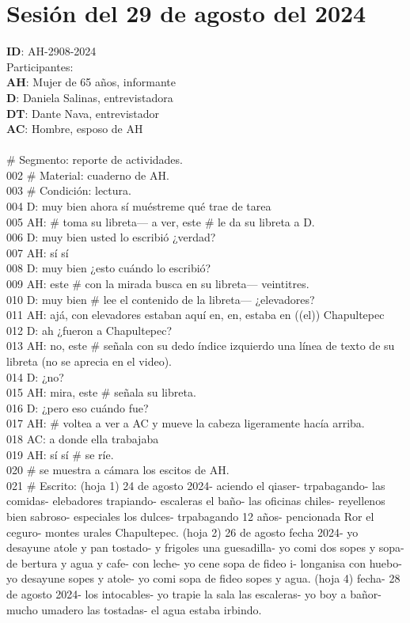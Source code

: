 \section{Sesión del 29 de agosto del 2024}
\noindent
\textbf{ID}: AH-2908-2024\\
Participantes:\\
\textbf{AH}: Mujer de 65 años, informante\\
\textbf{D}: Daniela Salinas, entrevistadora\\
\textbf{DT}: Dante Nava, entrevistador\\
\textbf{AC}: Hombre, esposo de AH\\
\\
 \# Segmento: reporte de actividades.\\
002 \# Material: cuaderno de AH.\\
003 \# Condición: lectura.\\
004 D: muy bien ahora sí muéstreme qué trae de tarea\\
005 AH: \# toma su libreta--- a ver, este \# le da su libreta a D.\\
006 D: muy bien usted lo escribió ¿verdad?\\
007 AH: sí sí\\
008 D: muy bien ¿esto cuándo lo escribió?\\
009 AH: este \# con la mirada busca en su libreta--- veintitres.\\
010 D: muy bien \# lee el contenido de la libreta--- ¿elevadores?\\
011 AH: ajá, con elevadores estaban aquí en, en, estaba en ((el)) Chapultepec\\
012 D: ah ¿fueron a Chapultepec?\\
013 AH: no, este \# señala con su dedo índice izquierdo una línea de texto de su libreta (no se aprecia en el video).\\
014 D: ¿no?\\
015 AH: mira, este \# señala su libreta.\\
016 D: ¿pero eso cuándo fue?\\
017 AH: \# voltea a ver a AC y mueve la cabeza ligeramente hacía arriba.\\
018 AC: a donde ella trabajaba\\
019 AH: sí sí \# se ríe.\\
020 \# se muestra a cámara los escitos de AH.\\
021 \# Escrito: (hoja 1) 24 de agosto 2024- aciendo el qiaser- trpabagando- las comidas- elebadores trapiando- escaleras el baño- las oficinas chiles- reyellenos bien sabroso- especiales los dulces- trpabagando 12 años- pencionada Ror el ceguro- montes urales Chapultepec. (hoja 2) 26 de agosto fecha 2024- yo desayune atole y pan tostado- y frigoles una guesadilla- yo comi dos sopes y sopa- de bertura y agua y cafe- con leche- yo cene sopa de fideo i- longanisa con huebo- yo desayune sopes y atole- yo comi sopa de fideo sopes y agua. (hoja 4) fecha- 28 de agosto 2024- los intocables- yo trapie la sala las escaleras- yo boy a bañor- mucho umadero las tostadas- el agua estaba irbindo.\\
